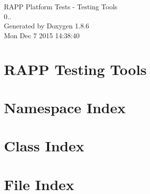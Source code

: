 \documentclass[twoside]{book}
\newcommand{\clearemptydoublepage}{%
  \newpage{\pagestyle{empty}\cleardoublepage}%
}
\begin{document}
\hypersetup{pageanchor=false}
\begin{titlepage}
\vspace*{7cm}
\begin{center}%
{\Large R\-A\-P\-P Platform Tests -\/ Testing Tools \\[1ex]\large 0.. }\\
\vspace*{1cm}
{\large Generated by Doxygen 1.8.6}\\
\vspace*{0.5cm}
{\small Mon Dec 7 2015 14:38:40}\\
\end{center}
\end{titlepage}
\clearemptydoublepage
\tableofcontents
\clearemptydoublepage
{}
\hypersetup{pageanchor=true}

\chapter{R\-A\-P\-P Testing Tools}
\label{md__home_travis_rapp_temp_rapp-platform_rapp_testing_tools_README}
\hypertarget{md__home_travis_rapp_temp_rapp-platform_rapp_testing_tools_README}{}

\chapter{Namespace Index}

\chapter{Class Index}

\chapter{File Index}

\end{document}
